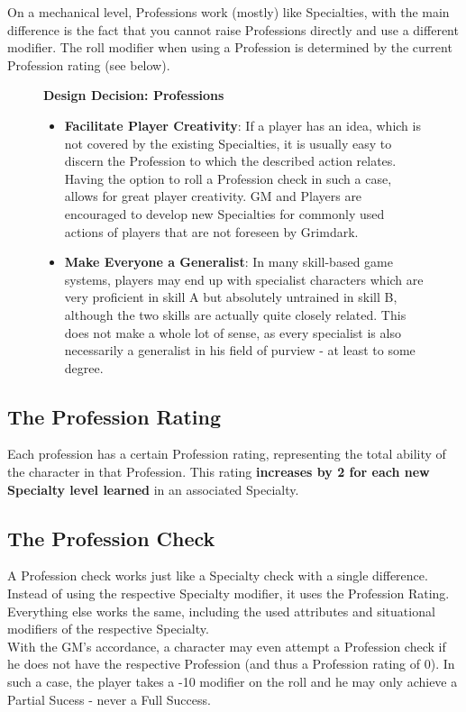 On a mechanical level, Professions work (mostly) like Specialties, with the main difference is the fact that you cannot raise Professions directly and use a different modifier.
The roll modifier when using a Profession is determined by the current Profession rating (see below).

\begin{figure}[hb]
	\begin{DndReadAloud}
	\textbf{Design Decision: Professions}
	\begin{itemize}
		\item \textbf{Facilitate Player Creativity}: If a player has an idea, which is not covered by the existing Specialties, it is usually easy to discern the Profession to which the described action relates. Having the option to roll a Profession check in such a case, allows for great player creativity. GM and Players are encouraged to develop new Specialties for commonly used actions of players that are not foreseen by Grimdark.
		\item \textbf{Make Everyone a Generalist}: In many skill-based game systems, players may end up with specialist characters which are very proficient in skill A but absolutely untrained in skill B, although the two skills are actually quite closely related. This does not make a whole lot of sense, as every specialist is also necessarily a generalist in his field of purview - at least to some degree.
		\end{itemize}
	\end{DndReadAloud}
\end{figure}

\subsection{The Profession Rating}
Each profession has a certain Profession rating, representing the total ability of the character in that Profession. 
This rating \textbf{increases by 2 for each new Specialty level learned} in an associated Specialty.

\subsection{The Profession Check}
A Profession check works just like a Specialty check with a single difference.
Instead of using the respective Specialty modifier, it uses the Profession Rating.
Everything else works the same, including the used attributes and situational modifiers of the respective Specialty.\\
With the GM's accordance, a character may even attempt a Profession check if he does not have the respective Profession (and thus a Profession rating of 0).
In such a case, the player takes a -10 modifier on the roll and he may only achieve a Partial Sucess - never a Full Success.

